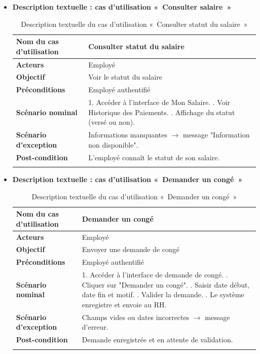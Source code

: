 \begin{itemize}
\item \textbf{Description textuelle : cas d'utilisation «~Consulter salaire~»}

\begin{center}
\begin{longtable}{|p{5cm}|p{11cm}|}
\hline
\textbf{Nom du cas d'utilisation} & Consulter statut du salaire \\ \hline
\textbf{Acteurs} & Employé \\ \hline
\textbf{Objectif} & Voir le statut du salaire \\ \hline
\textbf{Préconditions} & Employé authentifié \\ \hline
\textbf{Scénario nominal} &
1. Accéder à l'interface de Mon Salaire. \newline
2. Voir Historique des Paiements. \newline
3. Affichage du statut (versé ou non). \\ \hline
\textbf{Scénario d'exception} & Informations manquantes $\rightarrow$ message "Information non disponible". \\ \hline
\textbf{Post-condition} & L'employé connaît le statut de son salaire. \\ \hline
\caption{Description textuelle du cas d'utilisation «~Consulter statut du salaire~»}
\end{longtable}
\end{center}

\item \textbf{Description textuelle : cas d'utilisation «~Demander un congé~»}

\begin{center}
\begin{longtable}{|p{5cm}|p{11cm}|}
\hline
\textbf{Nom du cas d'utilisation} & Demander un congé \\ \hline
\textbf{Acteurs} & Employé \\ \hline
\textbf{Objectif} & Envoyer une demande de congé \\ \hline
\textbf{Préconditions} & Employé authentifié \\ \hline
\textbf{Scénario nominal} &
1. Accéder à l'interface de demande de congé. \newline
2. Cliquer sur "Demander un congé". \newline
3. Saisir date début, date fin et motif. \newline
4. Valider la demande. \newline
5. Le système enregistre et envoie au RH. \\ \hline
\textbf{Scénario d'exception} & Champs vides ou dates incorrectes $\rightarrow$ message d'erreur. \\ \hline
\textbf{Post-condition} & Demande enregistrée et en attente de validation. \\ \hline
\caption{Description textuelle du cas d'utilisation «~Demander un congé~»}
\end{longtable}
\end{center}


\end{itemize}
